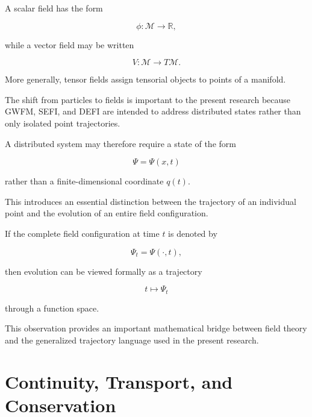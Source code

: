 \documentclass[12pt,oneside]{book}
\begin{document}
A scalar field has the form

\begin{equation}
    \phi:
    \mathcal{M}
    \rightarrow
    \mathbb{R},
\end{equation}

while a vector field may be written

\begin{equation}
    V:
    \mathcal{M}
    \rightarrow
    T\mathcal{M}.
\end{equation}

More generally, tensor fields assign tensorial objects to
points of a manifold.

The shift from particles to fields is important to the present
research because GWFM, SEFI, and DEFI are intended to address
distributed states rather than only isolated point
trajectories.

A distributed system may therefore require a state of the form

\begin{equation}
    \Psi
    =
    \Psi(x,t)
\end{equation}

rather than a finite-dimensional coordinate \(q(t)\).

This introduces an essential distinction between the trajectory
of an individual point and the evolution of an entire field
configuration.

If the complete field configuration at time \(t\) is denoted by

\begin{equation}
    \Psi_t
    =
    \Psi(\cdot,t),
\end{equation}

then evolution can be viewed formally as a trajectory

\begin{equation}
    t
    \longmapsto
    \Psi_t
\end{equation}

through a function space.

This observation provides an important mathematical bridge
between field theory and the generalized trajectory language
used in the present research.


\section{Continuity, Transport, and Conservation}
\label{sec:continuity-conservation-history}
\end{document}
